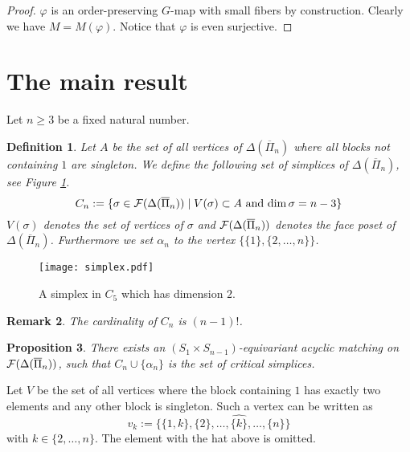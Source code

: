 \documentclass{elsarticle}
\newtheorem{df}{Definition}[section]
\newtheorem{prop}[df]{Proposition}
\newtheorem{rem}[df]{Remark}
\begin{document}
\begin{proof}
$\varphi$ is an order-preserving $G$-map with small fibers by construction. Clearly we have $M=M(\varphi)$. Notice that $\varphi$ is even surjective.
\end{proof}
\section{The main result}
Let $n\geq 3$ be a fixed natural number.
\begin{df}
Let $A$ be the set of all vertices of $\Delta(\overline{\Pi}_n)$ where all blocks not containing $1$ are singleton. We define the following set of simplices of $\Delta(\overline{\Pi}_n)$, see Figure \ref{exsimplex}.
\[
C_n:=\{\sigma\in{\cal F}(\Delta(\overline{\Pi}_n))\mid\text{$V(\sigma)\subset A$ and $\dim\sigma=n-3$}\}
\]
$V(\sigma)$ denotes the set of vertices of $\sigma$ and ${\cal F}(\Delta(\overline{\Pi}_n))$ denotes the face poset of $\Delta(\overline{\Pi}_n)$. Furthermore we set $\alpha_n$ to the vertex $\{\{1\},\{2,\dots,n\}\}$.
\end{df}
\begin{figure}[ht]
\centering
\texttt{[image: simplex.pdf]}
\caption{A simplex in $C_5$ which has dimension $2$.}
\label{exsimplex}
\end{figure}
\begin{rem}
\label{card}
The cardinality of $C_n$ is $(n-1)!$.
\end{rem}
\begin{prop}
\label{main}
There exists an $(S_1\times S_{n-1})$-equivariant acyclic matching on ${\cal F}(\Delta(\overline{\Pi}_n))$, such that $C_n\cup\{\alpha_n\}$ is the set of critical simplices.
\end{prop}
Let $V$ be the set of all vertices where the block containing $1$ has exactly two elements and any other block is singleton. Such a vertex can be written as
\[
v_k:=\{\{1,k\},\{2\},\dots,\widehat{\{k\}},\dots,\{n\}\}
\]
with $k\in\{2,\ldots, n\}$. The element with the hat above is omitted.
\end{document}
